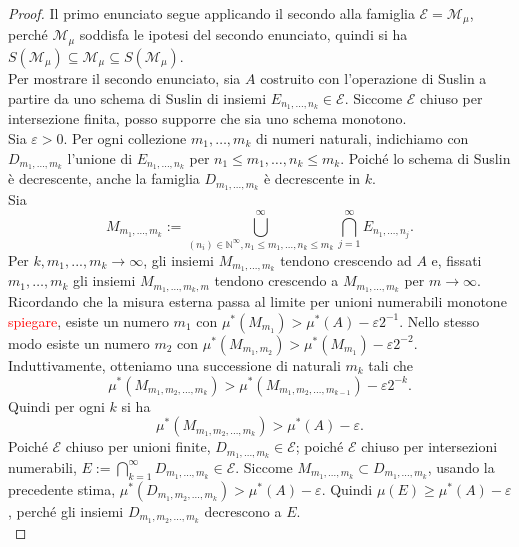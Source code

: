 \documentclass[a4paper, twoside,openright]{article}
\newcommand{\<}{\langle}
\renewcommand{\>}{\rangle}
\begin{document}
\begin{proof}
	Il primo enunciato segue applicando il secondo alla famiglia $\mathcal{E}=\mathcal{M}_{\mu}$, perché $\mathcal{M}_{\mu}$ soddisfa le ipotesi del secondo enunciato, quindi si ha $S(\mathcal{M}_{\mu}) \subseteq \mathcal{M}_{\mu} \subseteq S(\mathcal{M}_{\mu})$.\\
	Per mostrare il secondo enunciato, sia $A$ costruito con l'operazione di Suslin a partire da uno schema di Suslin di insiemi $E_{n_{1}, \ldots, n_{k}} \in \mathcal{E}$. Siccome $\mathcal{E}$ chiuso per intersezione finita, posso supporre che sia uno schema monotono.\\
	Sia $\varepsilon>0$. Per ogni collezione $m_{1}, \ldots, m_{k}$ di numeri naturali, indichiamo con $D_{m_{1}, \ldots, m_{k}}$ l'unione di $E_{n_{1}, \ldots, n_{k}}$ per $n_{1} \leq m_{1}, \ldots, n_{k} \leq m_{k}$. Poiché lo schema di Suslin è decrescente, anche la famiglia $D_{m_1,...,m_k}$ è decrescente in $k$.\\
	Sia
	$$
	M_{m_{1}, \ldots, m_{k}}:=\bigcup_{\left(n_{i}\right) \in \mathbb{N}^{\infty}, n_{1} \leq m_{1}, \ldots, n_{k} \leq m_{k}}^{\infty} \bigcap_{j=1}^{\infty} E_{n_{1}, \ldots, n_{j}} .
	$$
	Per $k, m_1,...,m_k \rightarrow \infty$, gli insiemi $M_{m_1,...,m_k}$ tendono crescendo ad $A$ e, fissati $m_{1}, \ldots, m_{k}$ gli insiemi $M_{m_{1}, \ldots, m_{k}, m}$  tendono crescendo a $M_{m_{1}, \ldots, m_{k}}$ per $m \rightarrow \infty$.\\
	Ricordando che la misura esterna passa al limite per unioni numerabili monotone  \textcolor{red}{spiegare}, esiste un numero $m_{1}$ con $\mu^{*}\left(M_{m_{1}}\right)>\mu^{*}(A)-\varepsilon 2^{-1}$. Nello stesso modo esiste un numero $m_{2}$ con $\mu^{*}\left(M_{m_{1}, m_{2}}\right)>\mu^{*}\left(M_{m_{1}}\right)-\varepsilon 2^{-2}$. Induttivamente, otteniamo una successione di naturali $m_{k}$ tali che
	$$
	\mu^{*}\left(M_{m_{1}, m_{2}, \ldots, m_{k}}\right)>\mu^{*}\left(M_{m_{1}, m_{2}, \ldots, m_{k-1}}\right)-\varepsilon 2^{-k} .
	$$
	Quindi per ogni $k$ si ha
	$$
	\mu^{*}\left(M_{m_{1}, m_{2}, \ldots, m_{k}}\right)>\mu^{*}(A)-\varepsilon .
	$$
	Poiché $\mathcal{E}$ chiuso per unioni finite, $D_{m_{1}, \ldots, m_{k}} \in \mathcal{E}$; poiché $\mathcal{E}$ chiuso per intersezioni numerabili, $E:=\bigcap_{k=1}^{\infty} D_{m_{1}, \ldots, m_{k}} \in \mathcal{E}$. Siccome $M_{m_{1}, \ldots, m_{k}} \subset D_{m_{1}, \ldots, m_{k}}$, usando la precedente stima, $\mu^{*}\left(D_{m_{1}, m_{2}, \ldots, m_{k}}\right)>\mu^{*}(A)-\varepsilon$. Quindi $\mu(E) \geq \mu^{*}(A)-\varepsilon$, perché gli insiemi $D_{m_{1}, m_{2}, \ldots, m_{k}}$ decrescono a $E$.\\

\end{proof}
\end{document}

